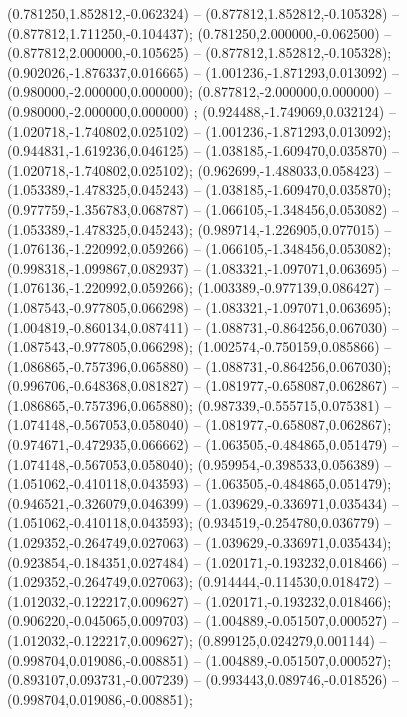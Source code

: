  (0.781250,1.852812,-0.062324) -- (0.877812,1.852812,-0.105328) -- (0.877812,1.711250,-0.104437);
 (0.781250,2.000000,-0.062500) -- (0.877812,2.000000,-0.105625) -- (0.877812,1.852812,-0.105328);
 (0.902026,-1.876337,0.016665) -- (1.001236,-1.871293,0.013092) -- (0.980000,-2.000000,0.000000);
 (0.877812,-2.000000,0.000000) -- (0.980000,-2.000000,0.000000) ;
 (0.924488,-1.749069,0.032124) -- (1.020718,-1.740802,0.025102) -- (1.001236,-1.871293,0.013092);
 (0.944831,-1.619236,0.046125) -- (1.038185,-1.609470,0.035870) -- (1.020718,-1.740802,0.025102);
 (0.962699,-1.488033,0.058423) -- (1.053389,-1.478325,0.045243) -- (1.038185,-1.609470,0.035870);
 (0.977759,-1.356783,0.068787) -- (1.066105,-1.348456,0.053082) -- (1.053389,-1.478325,0.045243);
 (0.989714,-1.226905,0.077015) -- (1.076136,-1.220992,0.059266) -- (1.066105,-1.348456,0.053082);
 (0.998318,-1.099867,0.082937) -- (1.083321,-1.097071,0.063695) -- (1.076136,-1.220992,0.059266);
 (1.003389,-0.977139,0.086427) -- (1.087543,-0.977805,0.066298) -- (1.083321,-1.097071,0.063695);
 (1.004819,-0.860134,0.087411) -- (1.088731,-0.864256,0.067030) -- (1.087543,-0.977805,0.066298);
 (1.002574,-0.750159,0.085866) -- (1.086865,-0.757396,0.065880) -- (1.088731,-0.864256,0.067030);
 (0.996706,-0.648368,0.081827) -- (1.081977,-0.658087,0.062867) -- (1.086865,-0.757396,0.065880);
 (0.987339,-0.555715,0.075381) -- (1.074148,-0.567053,0.058040) -- (1.081977,-0.658087,0.062867);
 (0.974671,-0.472935,0.066662) -- (1.063505,-0.484865,0.051479) -- (1.074148,-0.567053,0.058040);
 (0.959954,-0.398533,0.056389) -- (1.051062,-0.410118,0.043593) -- (1.063505,-0.484865,0.051479);
 (0.946521,-0.326079,0.046399) -- (1.039629,-0.336971,0.035434) -- (1.051062,-0.410118,0.043593);
 (0.934519,-0.254780,0.036779) -- (1.029352,-0.264749,0.027063) -- (1.039629,-0.336971,0.035434);
 (0.923854,-0.184351,0.027484) -- (1.020171,-0.193232,0.018466) -- (1.029352,-0.264749,0.027063);
 (0.914444,-0.114530,0.018472) -- (1.012032,-0.122217,0.009627) -- (1.020171,-0.193232,0.018466);
 (0.906220,-0.045065,0.009703) -- (1.004889,-0.051507,0.000527) -- (1.012032,-0.122217,0.009627);
 (0.899125,0.024279,0.001144) -- (0.998704,0.019086,-0.008851) -- (1.004889,-0.051507,0.000527);
 (0.893107,0.093731,-0.007239) -- (0.993443,0.089746,-0.018526) -- (0.998704,0.019086,-0.008851);
